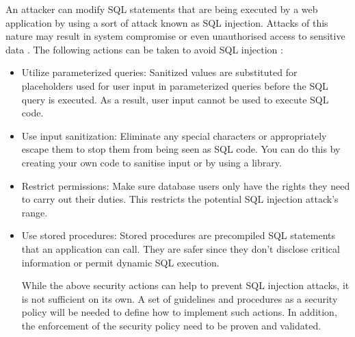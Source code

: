 \documentclass[journal]{IEEEtran}
\begin{document}
An attacker can modify SQL statements that are being executed 
by a web application by using a sort of attack known as SQL injection.
Attacks of this nature may result in system compromise or even 
unauthorised access to sensitive data \cite{Crespo2023}\cite{Shishir2023}. 
The following actions can be taken to avoid SQL injection \cite*{owaspsql}:

\begin{itemize}
\item {Utilize parameterized queries: Sanitized values are 
substituted for placeholders used for user input in parameterized 
queries before the SQL query is executed. As a result, user input 
cannot be used to execute SQL code.}


\item {Use input sanitization: Eliminate any special characters 
or appropriately escape them to stop them from being seen as SQL 
code. You can do this by creating your own code to sanitise input 
or by using a library.}

\item {Restrict permissions: Make sure database users only have 
the rights they need to carry out their duties. This restricts 
the potential SQL injection attack's range.}

\item {Use stored procedures: Stored procedures are precompiled 
SQL statements that an application can call. They are safer since 
they don't disclose critical information or permit dynamic SQL execution.}

While the above security actions can help to prevent SQL injection 
attacks, it is not sufficient on its own. A set of guidelines and procedures
as a security policy will be needed to define how to implement such actions. 
In addition, the enforcement of the security policy need to be proven and validated.

\end{itemize}
\end{document}

